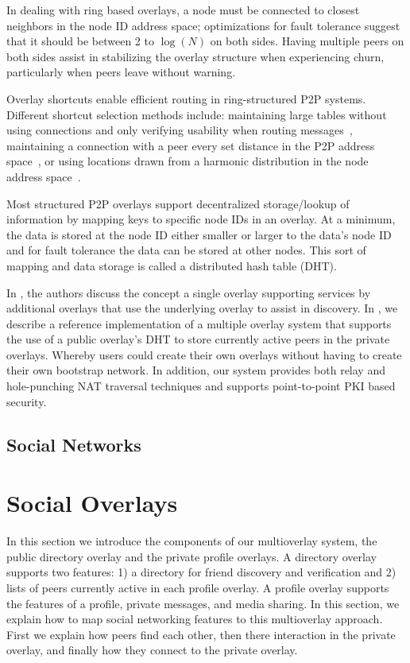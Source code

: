 \documentclass[letterpaper,twocolumn,10pt]{article}
\begin{document}
In dealing with ring based overlays, a node must be connected to closest
neighbors in the node ID address space; optimizations for fault tolerance
suggest that it should be between 2 to $\log(N)$ on both sides.  Having
multiple peers on both sides assist in stabilizing the overlay structure
when experiencing churn, particularly when peers leave without warning.

Overlay shortcuts enable efficient routing in ring-structured P2P systems.
Different shortcut selection methods include: maintaining large tables without
using connections and only verifying usability when routing
messages~\cite{pastry, kademlia}, maintaining a connection with a peer every
set distance in the P2P address space~\cite{chord}, or using locations drawn
from a harmonic distribution in the node address space~\cite{symphony}.

Most structured P2P overlays support decentralized storage/lookup of information by
mapping keys to specific node IDs in an overlay.  At a minimum, the data is stored
at the node ID either smaller or larger to the data's node ID and for fault
tolerance the data can be stored at other nodes.  This sort of mapping
and data storage is called a distributed hash table (DHT).

In \cite{one_ring, randpeer, can_multicast}, the authors
discuss the concept a single overlay supporting services by additional overlays
that use the underlying overlay to assist in discovery.  In \cite{icdcs10}, we
describe a reference implementation of a multiple overlay system that supports
the use of a public overlay's DHT to store currently active peers in the private
overlays.  Whereby users could create their own overlays without having to
create their own bootstrap network.  In addition, our system provides both relay
and hole-punching NAT traversal techniques and supports point-to-point PKI
based security.

\subsection{Social Networks}

\section{Social Overlays}
\label{social_overlays}
In this section we introduce the components of our multioverlay system,
the public directory overlay and the private profile overlays.  A directory
overlay supports two features:  1) a directory for friend discovery and
verification and 2) lists of peers currently active in each profile overlay.
A profile overlay supports the features of a profile, private messages, and
media sharing.  In this section, we explain how to map social networking
features to this multioverlay approach.  First we explain how peers find
each other, then there interaction in the private overlay, and finally how
they connect to the private overlay.
\end{document}

